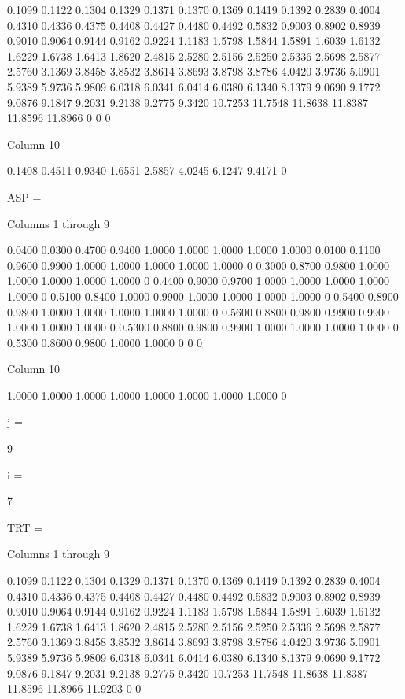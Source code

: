     0.1099    0.1122    0.1304    0.1329    0.1371    0.1370    0.1369    0.1419    0.1392
    0.2839    0.4004    0.4310    0.4336    0.4375    0.4408    0.4427    0.4480    0.4492
    0.5832    0.9003    0.8902    0.8939    0.9010    0.9064    0.9144    0.9162    0.9224
    1.1183    1.5798    1.5844    1.5891    1.6039    1.6132    1.6229    1.6738    1.6413
    1.8620    2.4815    2.5280    2.5156    2.5250    2.5336    2.5698    2.5877    2.5760
    3.1369    3.8458    3.8532    3.8614    3.8693    3.8798    3.8786    4.0420    3.9736
    5.0901    5.9389    5.9736    5.9809    6.0318    6.0341    6.0414    6.0380    6.1340
    8.1379    9.0690    9.1772    9.0876    9.1847    9.2031    9.2138    9.2775    9.3420
   10.7253   11.7548   11.8638   11.8387   11.8596   11.8966         0         0         0

  Column 10

    0.1408
    0.4511
    0.9340
    1.6551
    2.5857
    4.0245
    6.1247
    9.4171
         0


ASP =

  Columns 1 through 9

    0.0400    0.0300    0.4700    0.9400    1.0000    1.0000    1.0000    1.0000    1.0000
    0.0100    0.1100    0.9600    0.9900    1.0000    1.0000    1.0000    1.0000    1.0000
         0    0.3000    0.8700    0.9800    1.0000    1.0000    1.0000    1.0000    1.0000
         0    0.4400    0.9000    0.9700    1.0000    1.0000    1.0000    1.0000    1.0000
         0    0.5100    0.8400    1.0000    0.9900    1.0000    1.0000    1.0000    1.0000
         0    0.5400    0.8900    0.9800    1.0000    1.0000    1.0000    1.0000    1.0000
         0    0.5600    0.8800    0.9800    0.9900    0.9900    1.0000    1.0000    1.0000
         0    0.5300    0.8800    0.9800    0.9900    1.0000    1.0000    1.0000    1.0000
         0    0.5300    0.8600    0.9800    1.0000    1.0000         0         0         0

  Column 10

    1.0000
    1.0000
    1.0000
    1.0000
    1.0000
    1.0000
    1.0000
    1.0000
         0


j =

     9


i =

     7


TRT =

  Columns 1 through 9

    0.1099    0.1122    0.1304    0.1329    0.1371    0.1370    0.1369    0.1419    0.1392
    0.2839    0.4004    0.4310    0.4336    0.4375    0.4408    0.4427    0.4480    0.4492
    0.5832    0.9003    0.8902    0.8939    0.9010    0.9064    0.9144    0.9162    0.9224
    1.1183    1.5798    1.5844    1.5891    1.6039    1.6132    1.6229    1.6738    1.6413
    1.8620    2.4815    2.5280    2.5156    2.5250    2.5336    2.5698    2.5877    2.5760
    3.1369    3.8458    3.8532    3.8614    3.8693    3.8798    3.8786    4.0420    3.9736
    5.0901    5.9389    5.9736    5.9809    6.0318    6.0341    6.0414    6.0380    6.1340
    8.1379    9.0690    9.1772    9.0876    9.1847    9.2031    9.2138    9.2775    9.3420
   10.7253   11.7548   11.8638   11.8387   11.8596   11.8966   11.9203         0         0

